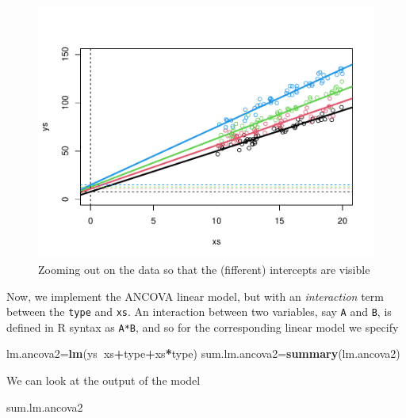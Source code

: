 \documentclass[
]{book}
\newenvironment{Shaded}{\begin{snugshade}}{\end{snugshade}}
\newcommand{\KeywordTok}[1]{\textcolor[rgb]{0.13,0.29,0.53}{\textbf{#1}}}
\newcommand{\NormalTok}[1]{#1}
\newcommand{\OperatorTok}[1]{\textcolor[rgb]{0.81,0.36,0.00}{\textbf{#1}}}
\begin{document}
\begin{figure}

{\centering \includegraphics[width=0.8\linewidth]{ECOMODbook_files/figure-latex/FCR-1} 

}

\caption{Zooming out on the data so that the (fifferent) intercepts are visible}\label{fig:FCR}
\end{figure}

Now, we implement the ANCOVA linear model, but with an \emph{interaction} term between the \texttt{type} and \texttt{xs}. An interaction between two variables, say \texttt{A} and \texttt{B}, is defined in R syntax as \texttt{A*B}, and so for the corresponding linear model we specify

\begin{Shaded}
\begin{Highlighting}[]
\NormalTok{lm.ancova2=}\KeywordTok{lm}\NormalTok{(ys}\OperatorTok{~}\NormalTok{xs}\OperatorTok{+}\NormalTok{type}\OperatorTok{+}\NormalTok{xs}\OperatorTok{*}\NormalTok{type)}
\NormalTok{sum.lm.ancova2=}\KeywordTok{summary}\NormalTok{(lm.ancova2)}
\end{Highlighting}
\end{Shaded}

We can look at the output of the model

\begin{Shaded}
\begin{Highlighting}[]
\NormalTok{sum.lm.ancova2}
\end{Highlighting}
\end{Shaded}
\end{document}
